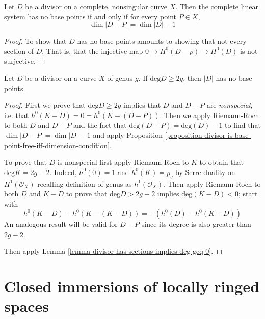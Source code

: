 \begin{proposition}
\label{proposition-divisor-is-base-point-free-iff-dimension-condition}
\begin{reference}
\cite[IV, Proposition 3.1(a)]{hart}
\end{reference}
Let $D$ be a divisor on a complete, nonsingular curve $X$. 
Then the complete linear system has no base
points if and only if for every point $P\in X$,
$$
\dim|D-P|=\dim|D|-1
$$
\end{proposition}

\begin{proof}
To show that $D$ has no base points amounts to showing that not every section of
$D$. That is, that the injective map $0\to H^{0}(D-p)\to H^{0}(D)$ is not 
surjective.
\end{proof}

\begin{lemma}
\label{lemma-degree-of-divisor-geq-2g-implies-base-point-free}
\begin{reference}
\cite[IV, Corollary 3.2(a), Examples 1.3.3, 1.3.4]{hart}
\end{reference}
Let $D$ be a divisor on a curve $X$ of genus $g$. 
If $\text{deg}D\geq 2g$, then
$|D|$ has no base points.
\end{lemma}

\begin{proof}
First we prove that $\text{deg}D\geq 2g$ implies that $D$ and $D-P$ are  
{\it nonspecial}, i.e. that
$h^0(K-D)=0=h^0(K-(D-P))$. Then we apply Riemann-Roch to both $D$ and $D-P$ and
the fact that  $\text{deg}(D-P)=\text{deg}(D)-1$ to find that
$\dim|D-P|=\dim|D|-1$ and apply Proposition 
\ref{proposition-divisor-is-base-point-free-iff-dimension-condition}.

To prove that $D$ is nonspecial first apply Riemann-Roch to $K$ to obtain that
$\text{deg}K=2g-2$. Indeed, $h^0(0)=1$ and $h^0(K)=p_g$ by Serre duality on
$H^1(\mathcal{O}_X)$ recalling definition of genus as $h^1(\mathcal{O}_X)$. 
Then apply Riemann-Roch to both $D$ and  $K-D$ to prove
that $\text{deg}D>2g-2$ implies $\text{deg}(K-D)<0$; start with
$$
h^0(K-D)-h^0(K-(K-D))=-(h^0(D)-h^0(K-D))
$$
An analogous result will be valid for $D-P$ since its degree is also greater
than $2g-2$.

Then apply Lemma
\ref{lemma-divisor-has-sections-implies-deg-geq-0}.
\end{proof}

\section{Closed immersions of locally ringed spaces}
\label{section-closed-immersion}

